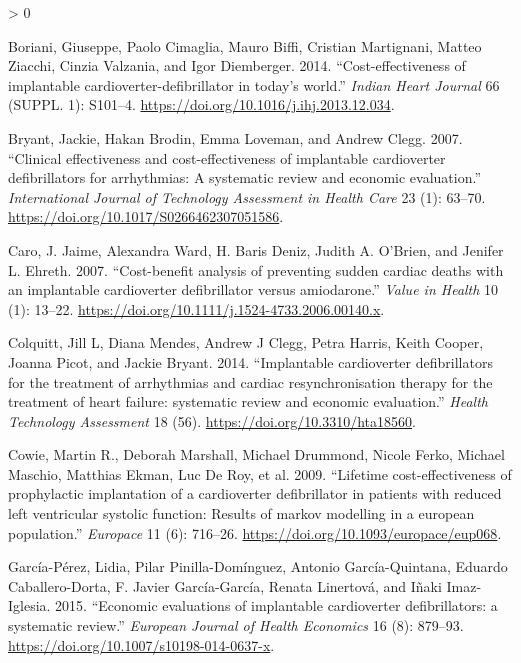 \documentclass[
]{article}
\newlength{\cslhangindent}
\newenvironment{CSLReferences}[2] %
 {%
  \setlength{\parindent}{0pt}
  \ifodd #1 \everypar{\setlength{\hangindent}{\cslhangindent}}\ignorespaces\fi
  \ifnum #2 > 0
  \setlength{\parskip}{#2\baselineskip}
  \fi
 }%
 {}
\begin{document}
\hypertarget{refs}{}
\begin{CSLReferences}{1}{0}
\leavevmode\hypertarget{ref-Boriani2014}{}%
Boriani, Giuseppe, Paolo Cimaglia, Mauro Biffi, Cristian Martignani, Matteo Ziacchi, Cinzia Valzania, and Igor Diemberger. 2014. {``{Cost-effectiveness of implantable cardioverter-defibrillator in today's world}.''} \emph{Indian Heart Journal} 66 (SUPPL. 1): S101--4. \url{https://doi.org/10.1016/j.ihj.2013.12.034}.

\leavevmode\hypertarget{ref-Bryant2007}{}%
Bryant, Jackie, Hakan Brodin, Emma Loveman, and Andrew Clegg. 2007. {``{Clinical effectiveness and cost-effectiveness of implantable cardioverter defibrillators for arrhythmias: A systematic review and economic evaluation}.''} \emph{International Journal of Technology Assessment in Health Care} 23 (1): 63--70. \url{https://doi.org/10.1017/S0266462307051586}.

\leavevmode\hypertarget{ref-Caro2007}{}%
Caro, J. Jaime, Alexandra Ward, H. Baris Deniz, Judith A. O'Brien, and Jenifer L. Ehreth. 2007. {``{Cost-benefit analysis of preventing sudden cardiac deaths with an implantable cardioverter defibrillator versus amiodarone}.''} \emph{Value in Health} 10 (1): 13--22. \url{https://doi.org/10.1111/j.1524-4733.2006.00140.x}.

\leavevmode\hypertarget{ref-Colquitt2014}{}%
Colquitt, Jill L, Diana Mendes, Andrew J Clegg, Petra Harris, Keith Cooper, Joanna Picot, and Jackie Bryant. 2014. {``{Implantable cardioverter defibrillators for the treatment of arrhythmias and cardiac resynchronisation therapy for the treatment of heart failure: systematic review and economic evaluation}.''} \emph{Health Technology Assessment} 18 (56). \url{https://doi.org/10.3310/hta18560}.

\leavevmode\hypertarget{ref-Cowie2009}{}%
Cowie, Martin R., Deborah Marshall, Michael Drummond, Nicole Ferko, Michael Maschio, Matthias Ekman, Luc De Roy, et al. 2009. {``{Lifetime cost-effectiveness of prophylactic implantation of a cardioverter defibrillator in patients with reduced left ventricular systolic function: Results of markov modelling in a european population}.''} \emph{Europace} 11 (6): 716--26. \url{https://doi.org/10.1093/europace/eup068}.

\leavevmode\hypertarget{ref-Garcia-Perez2015}{}%
García-Pérez, Lidia, Pilar Pinilla-Domínguez, Antonio García-Quintana, Eduardo Caballero-Dorta, F. Javier García-García, Renata Linertová, and Iñaki Imaz-Iglesia. 2015. {``{Economic evaluations of implantable cardioverter defibrillators: a systematic review}.''} \emph{European Journal of Health Economics} 16 (8): 879--93. \url{https://doi.org/10.1007/s10198-014-0637-x}.


\end{CSLReferences}
\end{document}

